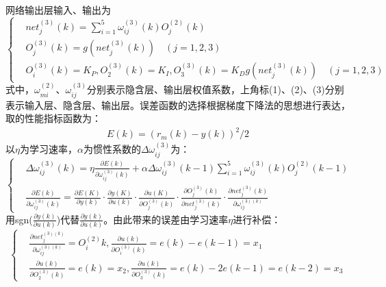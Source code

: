 \documentclass[UTF8,a4paper,10pt,nocolorlinks]{ctexart}
\begin{document}
    网络输出层输入、输出为
    \begin{equation}
        \begin{cases}
        & net_{j}^{(3)}(k)=\sum\limits_{i=1}^{5}\omega_{ij}^{(3)}(k)O_{j}^{(2)}(k)\\
        & O_{j}^{(3)}(k)=g(net_{j}^{(3)}(k)) \hspace{1em}(j=1,2,3) \\
        & O_{i}^{(3)}(k)=K_{P}, O_{2}^{(3)}(k)=K_{I}, O_{3}^{(3)}(k)=K_{D} g(net_{j}^{(3)}(k)) \hspace{1em}(j=1,2,3)
        \end{cases}
    \end{equation}
    式中，$\omega_{mi}^{(2)}$、$\omega_{ij}^{(3)}$分别表示隐含层、输出层权值系数，上角标(1)、(2)、(3)分别表示输入层、隐含层、输出层。误差函数的选择根据梯度下降法的思想进行表达，取的性能指标函数为：
    \begin{equation} %
        \begin{aligned}
        E(k) =(r_{m}(k) - y(k))^2/2  
        \end{aligned}
    \end{equation}
    以$\eta$为学习速率，$\alpha$为惯性系数的$\Delta\omega_{ij}^{(3)}$为：
    \begin{equation}
        \begin{cases}
        & \Delta\omega_{ij}^{(3)}(k)=\eta\frac{\partial E(k)}{\partial \omega_{ij}^{(3)}(k)} + \alpha\Delta\omega_{ij}^{(3)}(k-1)  \sum\limits_{i=1}^{5}\omega_{ij}^{(3)}(k)O_{j}^{(2)}(k-1)\\
        & \frac{\partial E(k)}{\partial \omega_{ij}^{(3)}(k)} = \frac{\partial E(K)}{\partial y(k)} \cdot{\frac{\partial y(K)}{\partial u(k)}} \cdot{\frac{\partial u(K)}{\partial O_j^{(3)}(k)}} \cdot{\frac{\partial O_j^{(3)}(k)}{\partial net_{j}^{(3)}(k)}} \cdot{\frac{\partial net_{j}^{(3)}(k)}{\partial \omega_{ij}^{(3)(k)}}}
        \end{cases}
        \label{con:formula1}
    \end{equation}
    用sgn($\frac{\partial y(k)}{\partial u(k)}$)代替$\frac{\partial y(k)}{\partial u(k)}$。由此带来的误差由学习速率$\eta$进行补偿：
    \begin{equation}
        \begin{cases}
        & \frac{\partial net_{j}^{(3)(k)}}{\partial \omega_{ij}^{(3)(k)}} = O_{i}^{(2)}{k}, \frac{\partial u(k)}{\partial O_{i}^{(3)}(k)} = e(k) - e(k-1) = x_{1} \\
        & \frac{\partial u(k)}{\partial O_{2}^{(3)}(k)} = e(k) = x_{2}, \frac{\partial u(k)}{\partial O_{3}^{(3)}(k)} = e(k) - 2e(k-1) = e(k-2) = x_{3}
        \end{cases}
    \end{equation}
\end{document}
